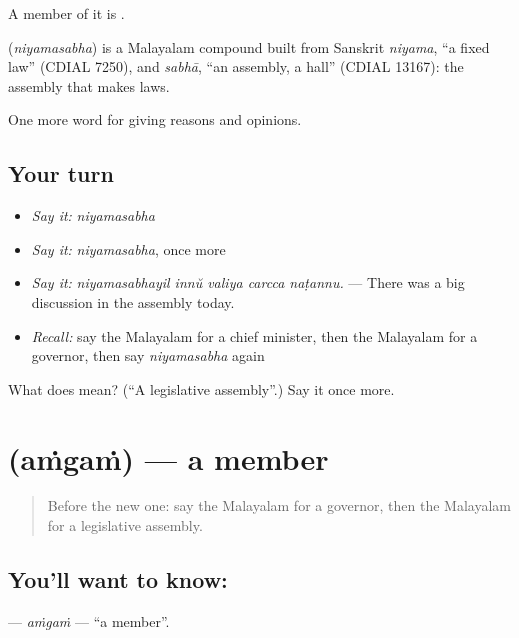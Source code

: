 A member of it is .

\begin{cousinweb}
\textbf{} (\emph{niyamasabha}) is a Malayalam compound built from Sanskrit \emph{niyama}, \textquotedblleft{}a fixed law\textquotedblright{} (CDIAL 7250), and \emph{sabhā}, \textquotedblleft{}an assembly, a hall\textquotedblright{} (CDIAL 13167): the assembly that makes laws.
\end{cousinweb}

\begin{grammarlens}[title={What you've built}]
One more word for giving reasons and opinions.
\end{grammarlens}

\subsection*{Your turn}
\begin{itemize}
\raggedright
  \item \emph{Say it:} \emph{niyamasabha}
  \item \emph{Say it:} \emph{niyamasabha}, once more
  \item \emph{Say it:} \emph{niyamasabhayil innŭ valiya carcca naṭannu.} — There was a big discussion in the assembly today.
  \item \emph{Recall:} say the Malayalam for a chief minister, then the Malayalam for a governor, then say \emph{niyamasabha} again
\end{itemize}

\begin{tcolorbox}[breakable,colback=teal!4,colframe=teal!35!black,title={Before you move on}]
What does  mean? (\textquotedblleft{}A legislative assembly\textquotedblright{}.) Say it once more.
\end{tcolorbox}
\section[\texorpdfstring{\ml{അംഗം} (aṁgaṁ)}{അംഗം (aṁgaṁ)}]{ (aṁgaṁ) — a member}

\label{lesson:ML-C422-amgam}



\begin{quote}
Before the new one: say the Malayalam for a governor, then the Malayalam for a legislative assembly.
\end{quote}

\subsection*{You'll want to know: }
\textbf{} — \emph{aṁgaṁ} — \textquotedblleft{}a member\textquotedblright{}.

